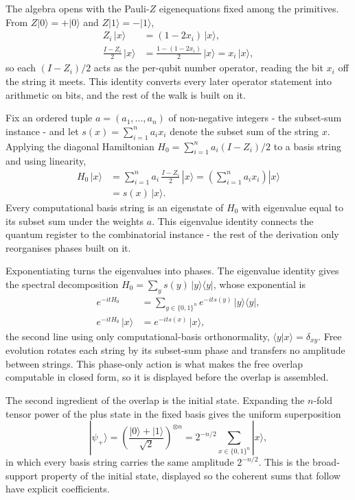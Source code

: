 The algebra opens with the Pauli-$Z$ eigenequations fixed among the primitives. From $Z|0\rangle = +|0\rangle$ and $Z|1\rangle = -|1\rangle$,
\begin{align*}
Z_i \, |x\rangle &= (1 - 2 x_i) \, |x\rangle , \\
\frac{I - Z_i}{2} \, |x\rangle &= \frac{1 - (1 - 2 x_i)}{2} \, |x\rangle = x_i \, |x\rangle ,
\end{align*}
so each $(I - Z_i)/2$ acts as the per-qubit number operator, reading the bit $x_i$ off the string it meets. This identity converts every later operator statement into arithmetic on bits, and the rest of the walk is built on it.

Fix an ordered tuple $a = (a_1, \dots, a_n)$ of non-negative integers - the subset-sum instance - and let $s(x) = \sum_{i=1}^{n} a_i x_i$ denote the subset sum of the string $x$. Applying the diagonal Hamiltonian $H_0 = \sum_{i=1}^{n} a_i (I - Z_i)/2$ to a basis string and using linearity,
\begin{align*}
H_0 \, |x\rangle &= \sum_{i=1}^{n} a_i \, \frac{I - Z_i}{2} \, |x\rangle
= \left( \sum_{i=1}^{n} a_i x_i \right) |x\rangle \\
&= s(x) \, |x\rangle .
\end{align*}
Every computational basis string is an eigenstate of $H_0$ with eigenvalue equal to its subset sum under the weights $a$. This eigenvalue identity connects the quantum register to the combinatorial instance - the rest of the derivation only reorganises phases built on it.

Exponentiating turns the eigenvalues into phases. The eigenvalue identity gives the spectral decomposition $H_0 = \sum_{y} s(y) \, |y\rangle\langle y|$, whose exponential is
\begin{align*}
e^{-i t H_0} &= \sum_{y \in \{0,1\}^n} e^{-i t s(y)} \, |y\rangle\langle y| , \\
e^{-i t H_0} \, |x\rangle &= e^{-i t s(x)} \, |x\rangle ,
\end{align*}
the second line using only computational-basis orthonormality, $\langle y | x \rangle = \delta_{xy}$. Free evolution rotates each string by its subset-sum phase and transfers no amplitude between strings. This phase-only action is what makes the free overlap computable in closed form, so it is displayed before the overlap is assembled.

The second ingredient of the overlap is the initial state. Expanding the $n$-fold tensor power of the plus state in the fixed basis gives the uniform superposition
\begin{equation*}
|\psi_+\rangle = \left( \frac{|0\rangle + |1\rangle}{\sqrt{2}} \right)^{\otimes n}
= 2^{-n/2} \sum_{x \in \{0,1\}^n} |x\rangle ,
\end{equation*}
in which every basis string carries the same amplitude $2^{-n/2}$. This is the broad-support property of the initial state, displayed so the coherent sums that follow have explicit coefficients.

